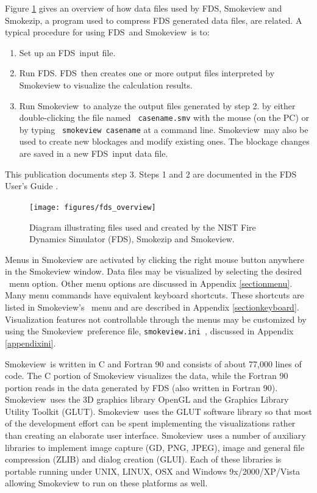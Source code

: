 \documentclass[11pt,twoside]{book}
\newcommand{\svini}{{\tt smokeview.ini}\ }
\newcommand{\figoptions}{hbp}
\newcommand{\fds}{{FDS}}
\newcommand{\Smokeview}{{Smokeview}}
\newcommand{\smokeview}{{Smokeview}}
\newcommand{\loadmenu}{\fbox{\tt Load/Unload} }
\newcommand{\helpmenu}{\fbox{\tt Help} }
\begin{document}
Figure \ref{figfdsoverview} gives an overview of how data files
used by FDS,  Smokeview and Smokezip, a program used to compress FDS generated data files, are related. A typical
procedure for using \fds\ and \smokeview\ is to:
\begin{enumerate}

\item Set up an \fds\ input file.

\item Run \fds.  \fds\ then creates one or more output files interpreted
by Smokeview to visualize the calculation results.

\item Run \smokeview\ to analyze the output files generated by
step 2. by either double-clicking the file named {\tt
casename.smv} with the mouse (on the PC) or by typing {\tt
smokeview casename} at a command line. \Smokeview\ may also be
used to create new blockages and modify existing ones. The
blockage changes are saved in a new \fds\ input data file.
\end{enumerate}

\noindent This publication documents step 3. Steps 1 and 2 are documented in
the FDS User's Guide \cite{FDS_Users_Guide_5}.

\begin{figure}[\figoptions]
\centerline{
\texttt{[image: figures/fds\_overview]}}
 \caption[FDS file overview]{Diagram illustrating files used and created by the NIST Fire Dynamics
 Simulator (FDS), Smokezip and Smokeview.}
\label{figfdsoverview}%
\end{figure}

Menus in Smokeview are activated by clicking the right mouse
button anywhere in the Smokeview window.  Data files may be
visualized by selecting the desired \loadmenu\ menu option. Other
menu options are discussed in Appendix \ref{sectionmenu}. Many
menu commands have equivalent keyboard shortcuts. These shortcuts
are listed in \smokeview's \helpmenu\ menu and are described in
Appendix \ref{sectionkeyboard}. Visualization features not
controllable through the menus may be customized by using the
\smokeview\ preference file, \svini, discussed in
Appendix \ref{appendixini}.

\Smokeview\ is written in C and Fortran 90 and consists of about
77,000 lines of code. The C portion of Smokeview visualizes the
data, while the Fortran 90 portion reads in the data generated by
FDS (also written in Fortran 90). \smokeview\ uses the 3D graphics
library OpenGL\cite{OpenGLRed} and the Graphics Library Utility
Toolkit (GLUT)\cite{OpenGLGlut}. \Smokeview\ uses the GLUT
software library so that most of the development effort can be
spent implementing the visualizations rather than creating an
elaborate user interface.  \Smokeview\ uses a number of auxiliary
libraries to implement image capture (GD\cite{BOUTELL,GDLIB},
PNG\cite{PNGLIB}, JPEG\cite{JPEGLIB}), image and general file
compression (ZLIB\cite{ZLIB}) and dialog creation
(GLUI\cite{GLUILIB}). Each of these libraries is portable running
under UNIX, LINUX, OSX and Windows 9x/2000/XP/Vista allowing Smokeview to run
on these platforms as well.
\end{document}
